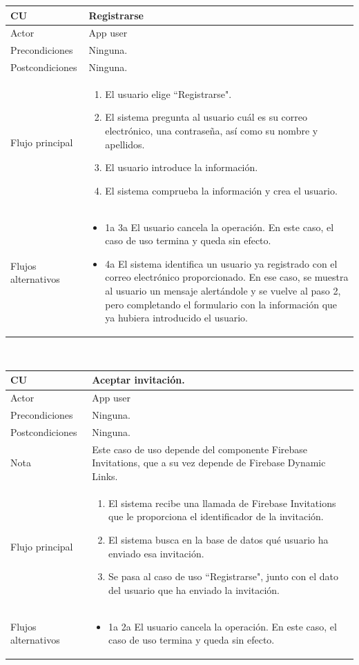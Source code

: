 \documentclass[twoside]{report}
\newcommand\addrow[2]{#1 &#2\\ }
\newcommand\addheading[2]{#1 &#2\\ \hline}
\newcommand\tabularhead{\begin{tabular}{lp{0.7\textwidth}}
\hline
}
\newenvironment{usecase}{\tabularhead}
{\hline\end{tabular}}
\begin{document}
\begin{usecase}
  \addheading{\textbf{CU\arabic{usecase}}}{Registrarse} 
  \addrow{Actor}{App user}
  \addrow{Precondiciones}{Ninguna.}
  \addrow{Postcondiciones}{Ninguna.}
  \addrow{Flujo principal}{
  		\begin{enumerate}
  		\item El usuario elige “Registrarse". %
  		\item El sistema pregunta al usuario cuál es su correo electrónico, una contraseña, así como su nombre y apellidos. %
  		\item El usuario introduce la información. %
  		\item El sistema comprueba la información y crea el usuario. %
  		\end{enumerate}
  }
  \addrow{Flujos alternativos}{
  		\begin{itemize}
  		\item 1a 3a El usuario cancela la operación. En este caso, el caso de uso termina y queda sin efecto.
  		\item 4a El sistema identifica un usuario ya registrado con el correo electrónico proporcionado. En ese caso, se muestra al usuario un mensaje alertándole y se vuelve al paso 2, pero completando el formulario con la información que ya hubiera introducido el usuario.
  		\end{itemize}
  }
\end{usecase}\\

\begin{usecase}
  \addheading{\textbf{CU\arabic{usecase}}}{Aceptar invitación.} 
  \addrow{Actor}{App user}
  \addrow{Precondiciones}{Ninguna.}
  \addrow{Postcondiciones}{Ninguna.}
  \addrow{Nota}{Este caso de uso depende del componente Firebase Invitations, que a su vez depende de Firebase Dynamic Links.}
  \addrow{Flujo principal}{
  		\begin{enumerate}
  		\item El sistema recibe una llamada de Firebase Invitations que le proporciona el identificador de la invitación.
  		\item El sistema busca en la base de datos qué usuario ha enviado esa invitación.
  		\item Se pasa al caso de uso “Registrarse", junto con el dato del usuario que ha enviado la invitación.
  		\end{enumerate}
  }
  \addrow{Flujos alternativos}{
  		\begin{itemize}
  		\item 1a 2a El usuario cancela la operación. En este caso, el caso de uso termina y queda sin efecto.
  		\end{itemize}
  }
\end{usecase}\\
\end{document}
